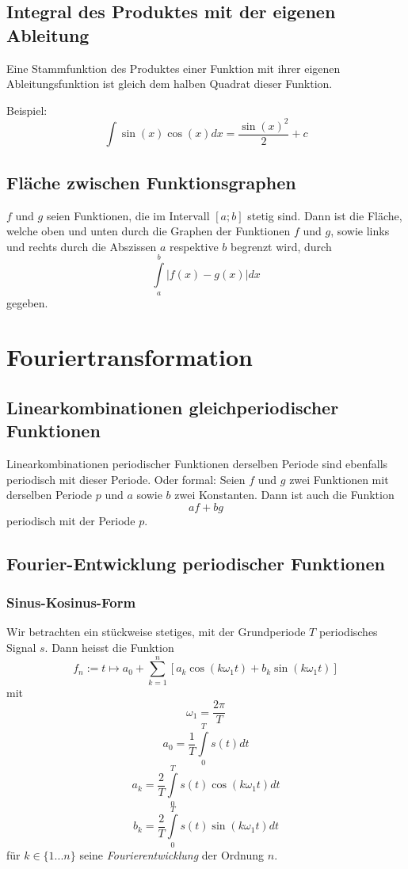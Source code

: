 \documentclass[10pt,a4paper]{scrartcl}
\begin{document}
\subsection{Integral des Produktes mit der eigenen Ableitung} 
Eine Stammfunktion des Produktes einer Funktion mit ihrer eigenen
Ableitungsfunktion ist gleich dem halben Quadrat dieser Funktion.

Beispiel:
$$\int \sin(x) \cos(x) dx = \frac{\sin(x)^2}{2} + c$$


\subsection{Fläche zwischen Funktionsgraphen} 

$f$ und $g$ seien Funktionen, die im Intervall $[a;b]$ stetig sind. Dann ist
die Fläche, welche oben und unten durch die Graphen der Funktionen $f$ und $g$,
sowie links und rechts durch die Abszissen $a$ respektive $b$ begrenzt wird, durch
$$\int\limits_a^b |f(x) - g(x)| dx$$
gegeben.




\section{Fouriertransformation}


\subsection{Linearkombinationen gleichperiodischer Funktionen}

Linearkombinationen periodischer Funktionen derselben Periode sind
ebenfalls periodisch mit dieser Periode. Oder formal: Seien $f$ und
$g$ zwei Funktionen mit derselben Periode $p$ und $a$ sowie $b$ zwei
Konstanten. Dann ist auch die Funktion
$$af+bg$$
periodisch mit der Periode $p$.


\subsection{Fourier-Entwicklung periodischer Funktionen}

\subsubsection{Sinus-Kosinus-Form}
Wir betrachten ein stückweise stetiges, mit der Grundperiode $T$
periodisches Signal $s$. Dann heisst die Funktion
$$f_n := t \mapsto a_0 + \sum_{k=1}^n \left[ a_k \cos(k\omega_1t) + b_k\sin(k\omega_1t)\right]$$
mit
$$\omega_1 = \frac{2\pi}{T}$$
$$a_0 = \frac{1}{T} \int\limits_0^T s(t) dt$$
$$a_k = \frac{2}{T} \int\limits_0^T s(t) \cos(k\omega_1t) dt$$
$$b_k = \frac{2}{T}\int\limits_0^T s(t) \sin(k\omega_1t) dt$$
für $k \in \{1...n\}$ seine \textit{Fourierentwicklung} der Ordnung $n$.
\end{document}
